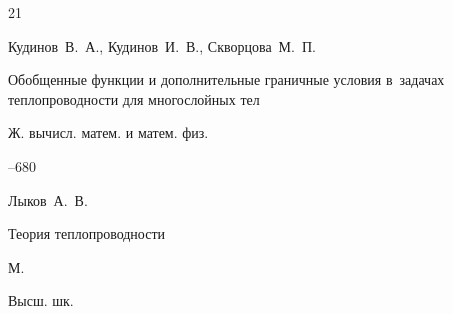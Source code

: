 \begin{thebibliography}{21}












\by Кудинов~В.~А., Кудинов~И.~В., Скворцова~М.~П.

\paper Обобщенные функции и дополнительные граничные условия в~задачах теплопроводности для многослойных тел

\jour Ж. вычисл. матем. и матем. физ.




--680





















\by Лыков~А.~В.

\book Теория теплопроводности

\publaddr М.

\publ Высш. шк.








\end{thebibliography}




